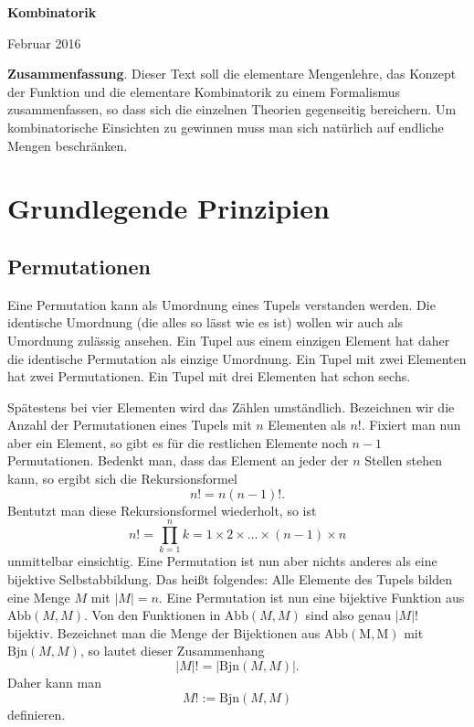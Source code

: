 \documentclass[a4paper,12pt,fleqn]{article}
\begin{document}
\noindent
{\huge\textbf{Kombinatorik}}
\vspace{2mm}

\noindent
Februar 2016

\tableofcontents
\vspace{4mm}

\noindent
\textbf{Zusammenfassung}. Dieser Text soll die elementare
Mengenlehre, das Konzept der Funktion und die elementare
Kombinatorik zu einem Formalismus zusammenfassen, so dass sich
die einzelnen Theorien gegenseitig bereichern. Um kombinatorische
Einsichten zu gewinnen muss man sich natürlich auf endliche
Mengen beschränken.

\section{Grundlegende Prinzipien}
\subsection{Permutationen}
Eine Permutation kann als Umordnung eines Tupels verstanden
werden. Die identische Umordnung (die alles so lässt wie es ist)
wollen wir auch als Umordnung zulässig ansehen. Ein Tupel aus
einem einzigen Element hat daher die identische Permutation als
einzige Umordnung. Ein Tupel mit zwei Elementen hat zwei
Permutationen. Ein Tupel mit drei Elementen hat schon sechs.

Spätestens bei vier Elementen wird das Zählen umständlich.
Bezeichnen wir die Anzahl der Permutationen eines Tupels
mit $n$ Elementen als $n!$. Fixiert man nun aber ein Element,
so gibt es für die restlichen Elemente noch $n-1$ Permutationen.
Bedenkt man, dass das Element an jeder der $n$ Stellen stehen
kann, so ergibt sich die Rekursionsformel
\[n! = n(n-1)!.\]
Bentutzt man diese Rekursionsformel wiederholt, so ist
\[n! = \prod_{k=1}^n k = 1\times 2\times\ldots\times(n-1)\times n\]
unmittelbar einsichtig. Eine Permutation ist nun aber nichts
anderes als eine bijektive Selbstabbildung. Das heißt folgendes:
Alle Elemente des Tupels bilden eine Menge $M$ mit $|M|=n$.
Eine Permutation ist nun eine bijektive Funktion aus
$\mathrm{Abb}(M,M)$. Von den Funktionen in $\mathrm{Abb}(M,M)$
sind also genau $|M|!$ bijektiv. Bezeichnet man die Menge
der Bijektionen aus $\mathrm{Abb(M,M)}$ mit
$\mathrm{Bjn}(M,M)$, so lautet dieser Zusammenhang
\[|M|! = |\mathrm{Bjn}(M,M)|.\]
Daher kann man
\[M!:=\mathrm{Bjn}(M,M)\]
definieren.
\end{document}
